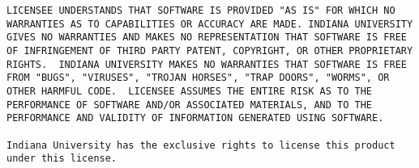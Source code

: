 \begin{verbatim}
LICENSEE UNDERSTANDS THAT SOFTWARE IS PROVIDED "AS IS" FOR WHICH NO
WARRANTIES AS TO CAPABILITIES OR ACCURACY ARE MADE. INDIANA UNIVERSITY
GIVES NO WARRANTIES AND MAKES NO REPRESENTATION THAT SOFTWARE IS FREE
OF INFRINGEMENT OF THIRD PARTY PATENT, COPYRIGHT, OR OTHER PROPRIETARY
RIGHTS.  INDIANA UNIVERSITY MAKES NO WARRANTIES THAT SOFTWARE IS FREE
FROM "BUGS", "VIRUSES", "TROJAN HORSES", "TRAP DOORS", "WORMS", OR
OTHER HARMFUL CODE.  LICENSEE ASSUMES THE ENTIRE RISK AS TO THE
PERFORMANCE OF SOFTWARE AND/OR ASSOCIATED MATERIALS, AND TO THE
PERFORMANCE AND VALIDITY OF INFORMATION GENERATED USING SOFTWARE.

Indiana University has the exclusive rights to license this product
under this license.
\end{verbatim}

